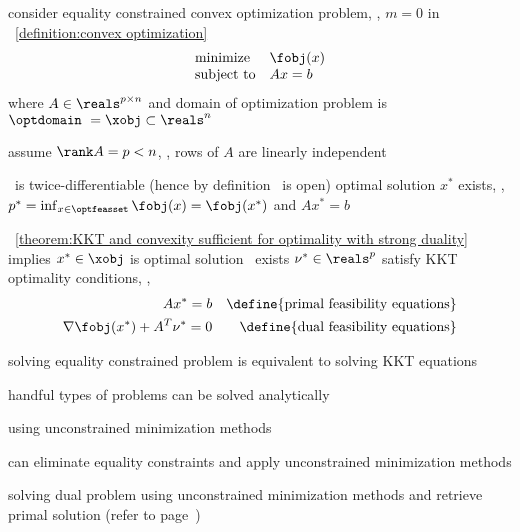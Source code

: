 \documentclass[17pt,landscape]{foils}
\begin{document}
{


\bit
\item
	consider
	equality constrained convex optimization problem,
	\ie, $m=0$ in ~\ref{definition:convex optimization}
	$$
		\begin{array}{ll}
			\mbox{minimize} &
				\fobj(x)
			\\
			\mbox{subject to} &
				Ax = b
		\end{array}
	$$
	where
		$A\in\reals^{p\times n}$
	and
		domain of optimization problem is $\optdomain\ = \xobj \subset \reals^n$

\vvitem
	assume
	\bit
	\vitem
		$\rank A = p<n$,
		\ie, rows of $A$ are linearly independent
	\vitem


		\fobj\ is twice-differentiable (hence by definition \xobj\ is open)
	\vitem
		optimal solution $x^\ast$ exists, \ie, $p^\ast = \inf_{x\in\optfeasset} \fobj(x) = \fobj(x^\ast)$
		and $Ax^\ast = b$
	\eit
\eit
\vfill



\bit
\item
	\theoremname~\ref{theorem:KKT and convexity sufficient for optimality with strong duality}
	implies
	$x^\ast\in\xobj$ is optimal solution \iaoi\
	exists $\nu^\ast\in\reals^p$
	satisfy KKT optimality conditions,%
	\ie,
	\begin{eqnarray*}
		Ax^\ast = b
		&&\mbox{\define{primal feasibility equations}}
		\\
		\nabla \fobj(x^\ast) + A^T\nu^\ast = 0
		&&\mbox{\define{dual feasibility equations}}
	\end{eqnarray*}

\vitem
	solving equality constrained problem
	is equivalent to
	solving KKT equations
	\bit
	\item
		handful types of problems can be solved analytically
	\eit

\vitem
	using unconstrained minimization methods
	\bit
	\item
		can eliminate equality constraints and apply unconstrained minimization methods
	\item
		solving dual problem using unconstrained minimization methods
		and retrieve primal solution (refer to page~\pageref{page:Solving primal problems via dual problems})
	\eit

}
\end{document}
